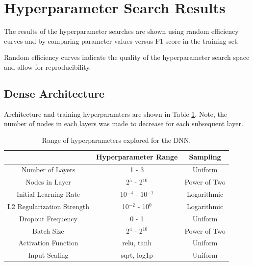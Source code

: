 \section{Hyperparameter Search Results}

The results of the hyperparameter searches are shown using random efficiency curves and by comparing parameter values versus F1 score in the training set.

Random efficiency curves indicate the quality of the hyperparameter search space and allow for reproducibility. 



\subsection{Dense Architecture}

Architecture and training hyperparamters are shown in Table \ref{table:hyperparameter_dataset_parameters_DNN}. Note, the number of nodes in each layers was made to decrease for each subsequent layer.

\begin{table}[H]
\centering
\caption{Range of hyperparameters explored for the DNN.}
\label{table:hyperparameter_dataset_parameters_DNN}
\begin{tabular}{ccc}
 & Hyperparameter Range & Sampling \\ \hline
\multicolumn{1}{c}{Number of Layers} & 1 - 3 & Uniform \\ %
\multicolumn{1}{c}{Nodes in Layer} & 2$^{5}$ - 2$^{10}$ & Power of Two \\ %
\multicolumn{1}{c}{Initial Learning Rate} & 10$^{-4}$ - 10$^{-1}$ & Logarithmic \\ %
\multicolumn{1}{c}{L2 Regularization Strength} & 10$^{-2}$ - 10$^{0}$ & Logarithmic \\ %
\multicolumn{1}{c}{Dropout Frequency} & 0 - 1 & Uniform \\ %
\multicolumn{1}{c}{Batch Size} & 2$^{4}$ - 2$^{10}$ & Power of Two \\ %
\multicolumn{1}{c}{Activation Function} & relu, tanh & Uniform \\ %
\multicolumn{1}{c}{Input Scaling} & sqrt, log1p & Uniform \\ %
\end{tabular}
\end{table}



